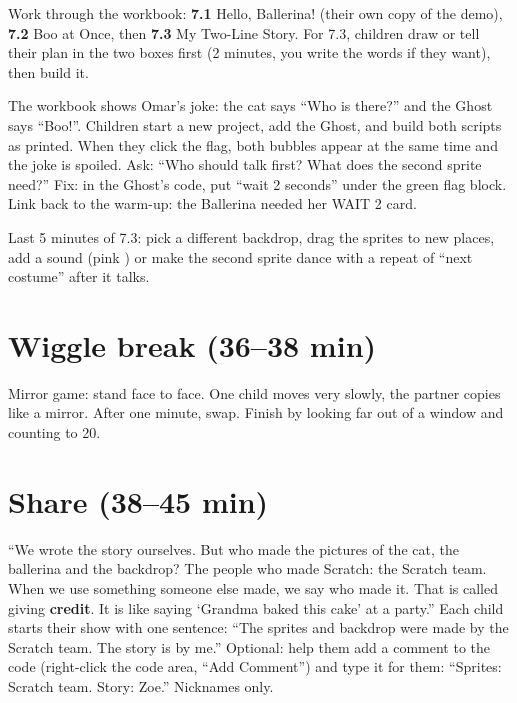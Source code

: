 Work through the workbook: \textbf{7.1} Hello, Ballerina! (their own copy of the demo), \textbf{7.2} Boo at Once, then \textbf{7.3} My Two-Line Story. For 7.3, children draw or tell their plan in the two boxes first (2 minutes, you write the words if they want), then build it.

\begin{bughunt}
The workbook shows Omar's joke: the cat says \enquote{Who is there?} and the Ghost says \enquote{Boo!}. Children start a new project, add the Ghost, and build both scripts as printed. When they click the flag, both bubbles appear at the same time and the joke is spoiled. Ask: \enquote{Who should talk first? What does the second sprite need?} Fix: in the Ghost's code, put \enquote{wait 2 seconds} under the green flag block. Link back to the warm-up: the Ballerina needed her WAIT 2 card.
\end{bughunt}

\begin{freebuild}
Last 5 minutes of 7.3: pick a different backdrop, drag the sprites to new places, add a sound (pink ) or make the second sprite dance with a repeat of \enquote{next costume} after it talks.
\end{freebuild}

\section{Wiggle break (36--38 min)}
Mirror game: stand face to face. One child moves very slowly, the partner copies like a mirror. After one minute, swap. Finish by looking far out of a window and counting to 20.

\section{Share (38--45 min)}
\begin{safety}
\enquote{We wrote the story ourselves. But who made the pictures of the cat, the ballerina and the backdrop? The people who made Scratch: the Scratch team. When we use something someone else made, we say who made it. That is called giving \textbf{credit}. It is like saying \enquote{Grandma baked this cake} at a party.} Each child starts their show with one sentence: \enquote{The sprites and backdrop were made by the Scratch team. The story is by me.} Optional: help them add a comment to the code (right-click the code area, \enquote{Add Comment}) and type it for them: \enquote{Sprites: Scratch team. Story: Zoe.} Nicknames only.
\end{safety}

